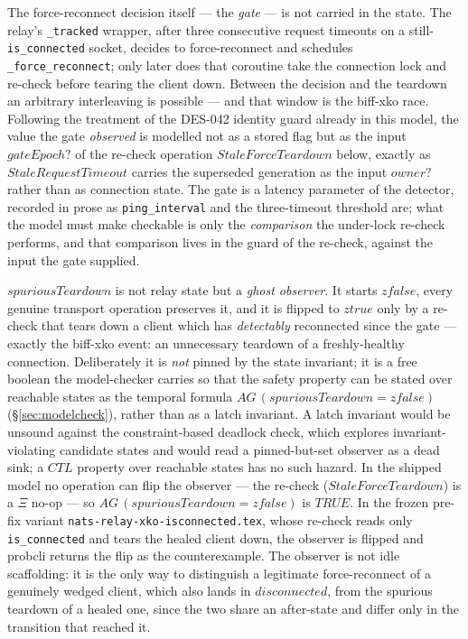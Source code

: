 \documentclass[a4paper,10pt,fleqn]{article}
\begin{document}
The force-reconnect decision itself --- the \emph{gate} ---
is not carried in the state.  The relay's \texttt{\_tracked} wrapper,
after three consecutive request timeouts on a still-\texttt{is\_connected}
socket, decides to force-reconnect and schedules
\texttt{\_force\_reconnect}; only later does that coroutine take the
connection lock and re-check before tearing the client down.  Between
the decision and the teardown an arbitrary interleaving is possible ---
and that window is the biff-xko race.  Following the treatment of the
DES-042 identity guard already in this model, the value the gate
\emph{observed} is modelled not as a stored flag but as the input
$gateEpoch?$ of the re-check operation $StaleForceTeardown$ below,
exactly as $StaleRequestTimeout$ carries the superseded generation as
the input $owner?$ rather than as connection state.  The gate is a
latency parameter of the detector, recorded in prose as
\texttt{ping\_interval} and the three-timeout threshold are; what the
model must make checkable is only the \emph{comparison} the under-lock
re-check performs, and that comparison lives in the guard of the
re-check, against the input the gate supplied.

$spuriousTeardown$ is not relay state but a \emph{ghost observer}.  It
starts $zfalse$, every genuine transport operation preserves it, and it
is flipped to $ztrue$ only by a re-check that tears down a client which
has \emph{detectably} reconnected since the gate --- exactly the
biff-xko event: an unnecessary teardown of a freshly-healthy connection.
Deliberately it is \emph{not} pinned by the state invariant; it is a
free boolean the model-checker carries so that the safety property can
be stated over reachable states as the temporal formula
$AG\,(spuriousTeardown = zfalse)$ (\S\ref{sec:modelcheck}), rather than
as a latch invariant.  A latch invariant would be unsound against the
constraint-based deadlock check, which explores invariant-violating
candidate states and would read a pinned-but-set observer as a dead
sink; a $CTL$ property over reachable states has no such hazard.  In the
shipped model no operation can flip the observer --- the re-check
($StaleForceTeardown$) is a $\Xi$ no-op --- so $AG\,(spuriousTeardown =
zfalse)$ is $TRUE$.  In the frozen pre-fix variant
\texttt{nats-relay-xko-isconnected.tex}, whose re-check reads only
\texttt{is\_connected} and tears the healed client down, the observer is
flipped and probcli returns the flip as the counterexample.  The
observer is not idle scaffolding: it is the only way to distinguish a
legitimate force-reconnect of a genuinely wedged client, which also
lands in $disconnected$, from the spurious teardown of a healed one,
since the two share an after-state and differ only in the transition
that reached it.
\end{document}
